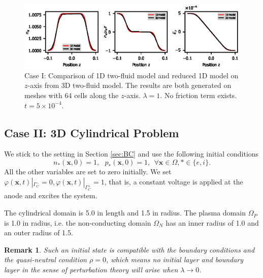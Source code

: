 \documentclass{article}
\newtheorem*{remark}{Remark}
\begin{document}
\begin{figure}
    \centering
    \includegraphics[scale=1.2]{z_axis_reduction.eps}
    \caption{Case I: Comparison of 1D two-fluid model and reduced 1D model on $z$-axis from 3D two-fluid model. The results are both generated on meshes with 64 cells along the $z$-axis. $\lambda = 1$. No friction term exists. $t = 5 \times 10^{-4}.$}
    \label{fig:z_axis_reduction}
\end{figure}

\subsection{Case II: 3D Cylindrical Problem}

We stick to the setting in Section \ref{sec:BC} and use the following initial conditions
\begin{equation*}
    n_\ast(\mathbf{x}, 0) = 1, \ \ \  p_\ast(\mathbf{x},0) = 1, \ \ \forall \mathbf{x}\in\Omega, \ast \in \{e, i\}.
\end{equation*}
All the other variables are set to zero initially. We set $\varphi(\mathbf{x}, t)|_{\Gamma_C^-} = 0, \varphi(\mathbf{x}, t)|_{\Gamma_C^+} = 1$, that is, a constant voltage is applied at the anode and excites the system. 

The cylindrical domain is 5.0 in length and 1.5 in radius. The plasma domain $\Omega_P$ is 1.0 in radius, i.e. the non-conducting domain $\Omega_N$ has an inner radius of 1.0 and an outer radius of 1.5. 

\begin{remark}
    Such an initial state is compatible with the boundary conditions and the quasi-neutral condition $\rho = 0$, which means no initial layer and boundary layer in the sense of perturbation theory will arise when $\lambda \rightarrow 0$. 
\end{remark}
\end{document}
